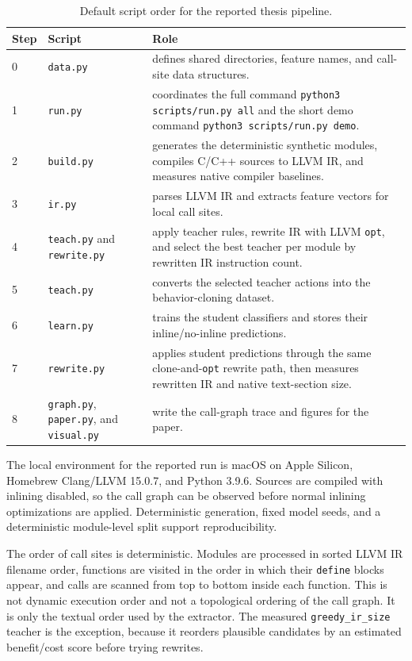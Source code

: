 \documentclass[12pt, a4paper]{report}
\begin{document}
\begin{table}[H]
\centering
{\small
\begin{tabular}{|p{}|p{}|p{}|}
\hline
Step & Script & Role \\
\hline
0 & \texttt{data.py} & defines shared directories, feature names, and
call-site data structures. \\
\hline
1 & \texttt{run.py} & coordinates the full command
\texttt{python3 scripts/run.py all} and the short demo command
\texttt{python3 scripts/run.py demo}. \\
\hline
2 & \texttt{build.py} & generates the deterministic synthetic modules, compiles
C/C++ sources to LLVM IR, and measures native compiler baselines. \\
\hline
3 & \texttt{ir.py} & parses LLVM IR and extracts feature vectors for local call
sites. \\
\hline
4 & \texttt{teach.py} and \texttt{rewrite.py} & apply teacher rules, rewrite IR
with LLVM \texttt{opt}, and select the best teacher per module by rewritten IR
instruction count. \\
\hline
5 & \texttt{teach.py} & converts the selected teacher actions into the
behavior-cloning dataset. \\
\hline
6 & \texttt{learn.py} & trains the student classifiers and stores their
inline/no-inline predictions. \\
\hline
7 & \texttt{rewrite.py} & applies student predictions through the same
clone-and-\texttt{opt} rewrite path, then measures rewritten IR and native
text-section size. \\
\hline
8 & \texttt{graph.py}, \texttt{paper.py}, and \texttt{visual.py} & write the
call-graph trace and figures for the paper. \\
\hline
\end{tabular}
}
\caption{Default script order for the reported thesis pipeline.}
\label{tab:pipeline-scripts}
\end{table}

The local environment for the reported run is macOS on Apple Silicon, Homebrew
Clang/LLVM 15.0.7, and Python 3.9.6. Sources are compiled with inlining
disabled, so the call graph can be observed before normal inlining optimizations
are applied. Deterministic generation, fixed model seeds, and a deterministic
module-level split support reproducibility.

The order of call sites is deterministic. Modules are processed in sorted LLVM
IR filename order, functions are visited in the order in which their
\texttt{define} blocks appear, and calls are scanned from top to bottom inside
each function. This is not dynamic execution order and not a topological
ordering of the call graph. It is only the textual order used by the extractor.
The measured \texttt{greedy\_ir\_size} teacher is the exception, because it
reorders plausible candidates by an estimated benefit/cost score before trying
rewrites.
\end{document}

